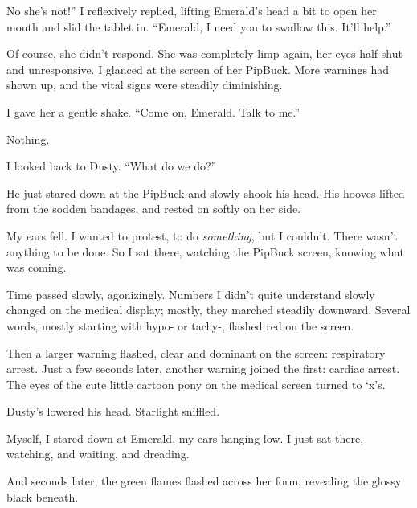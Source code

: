 \leavevmode{}No she’s not!” I reflexively replied, lifting Emerald’s head a bit to open her mouth and slid the tablet in. “Emerald, I need you to swallow this. It’ll help.”

Of course, she didn’t respond. She was completely limp again, her eyes half-shut and unresponsive. I glanced at the screen of her PipBuck. More warnings had shown up, and the vital signs were steadily diminishing.

I gave her a gentle shake. “Come on, Emerald. Talk to me.”

Nothing.

I looked back to Dusty. “What do we do?”

He just stared down at the PipBuck and slowly shook his head. His hooves lifted from the sodden bandages, and rested on softly on her side.

My ears fell. I wanted to protest, to do \textit{something}, but I couldn’t. There wasn’t anything to be done. So I sat there, watching the PipBuck screen, knowing what was coming.

Time passed slowly, agonizingly. Numbers I didn’t quite understand slowly changed on the medical display; mostly, they marched steadily downward. Several words, mostly starting with hypo- or tachy-, flashed red on the screen.

Then a larger warning flashed, clear and dominant on the screen: respiratory arrest. Just a few seconds later, another warning joined the first: cardiac arrest. The eyes of the cute little cartoon pony on the medical screen turned to ‘x’s.

Dusty’s lowered his head. Starlight sniffled.

Myself, I stared down at Emerald, my ears hanging low. I just sat there, watching, and waiting, and dreading.

And seconds later, the green flames flashed across her form, revealing the glossy black beneath.
